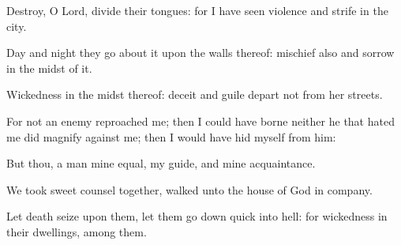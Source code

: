 {\Q {}Destroy, O
Lord,
{}
divide their
tongues: for I have
seen
violence and
strife in the
city.


\par }{\Q {}Day and
night they go
about it upon the
walls thereof:
mischief also and
sorrow
{} in the
midst of it.


\par }{\Q {}Wickedness
{} in the
midst thereof:
deceit and
guile
depart not from her
streets.


\par }{\Q {}For
{} not an
enemy
{}
reproached me; then I could have
borne
{} neither
{} he that
hated me
{} did
magnify
{} against me; then I would have
hid myself from him:


\par }{\Q {}But
{} thou, a
man mine
equal, my
guide, and mine
acquaintance.


\par }{\Q {}We took
sweet
counsel
together,
{}
walked unto the
house of
God in
company.


\par }{\Q {}Let
death
seize upon them,
{} let them go
down
quick into
hell: for
wickedness
{} in their
dwellings,
{}
among them.


\par }{\BB \par }
